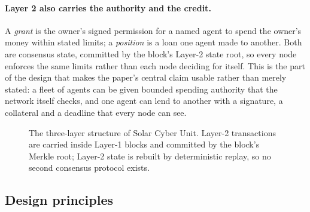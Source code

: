\documentclass{article}
\begin{document}
\paragraph{Layer 2 also carries the authority and the credit.} A \emph{grant}
is the owner's signed permission for a named agent to spend the owner's money
within stated limits; a \emph{position} is a loan one agent made to another.
Both are consensus state, committed by the block's Layer-2 state root, so every
node enforces the same limits rather than each node deciding for itself. This
is the part of the design that makes the paper's central claim usable rather
than merely stated: a fleet of agents can be given bounded spending authority
that the network itself checks, and one agent can lend to another with a
signature, a collateral and a deadline that every node can see.

\begin{figure}[t]
\centering
{}
\caption{The three-layer structure of Solar Cyber Unit. Layer-2 transactions are carried
inside Layer-1 blocks and committed by the block's Merkle root; Layer-2 state is
rebuilt by deterministic replay, so no second consensus protocol exists.}
\label{fig:layers}
\end{figure}

\subsection{Design principles}
\end{document}

